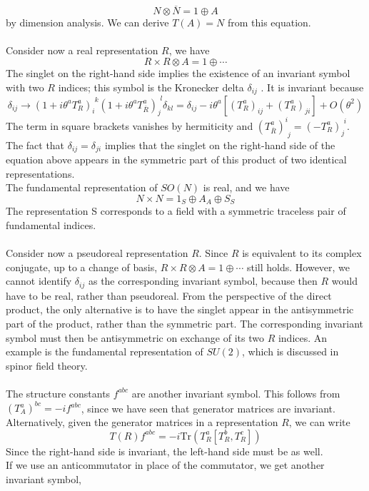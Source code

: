 \documentclass[cyan]{elegantnote}
\begin{document}
\[N \otimes \overline{N} = 1 \oplus A \]
by dimension analysis. We can derive $T(A) = N$ from this equation.
\\ \\
Consider now a real representation $R$, we have
\[R \times R \otimes A = 1 \oplus \cdots\]
The singlet on the right-hand side implies the existence of an invariant symbol with two $R$ indices; this symbol is the Kronecker delta $\delta_{ij}$ . It is invariant because
\[\delta_{ij} \to (1+i\theta^a T^a_R)_{i}^{\phantom{i}k} (1+i\theta^a T^a_{\overline{R}})_{j}^{\phantom{i}l}\delta_{kl} = \delta_{ij} - i\theta^a [(T^a_R)_{ij} + (T^a_R)_{ji}] + O(\theta^2)\]
The term in square brackets vanishes by hermiticity and $(T^{a}_{\overline{R}})^{i}_{\phantom{i}j} = (-T^{a}_R)_{j}^{\phantom{i}i}$. 
The fact that $\delta_{ij} = \delta_{ji}$ implies that the singlet on the right-hand side of the equation above appears in the symmetric part of this product of two identical representations.
\\
The fundamental representation of $SO(N)$ is real, and we have
\[N \times N = 1_S \oplus A_A \oplus S_S\]
The representation S corresponds to a field with a symmetric traceless pair of fundamental indices.
\\ \\
Consider now a pseudoreal representation $R$. Since $R$ is equivalent to its complex conjugate, up to a change of basis, $R \times R \otimes A = 1 \oplus \cdots$  still holds. However, we cannot identify $\delta_{ij}$ as the corresponding invariant symbol, because then $R$ would have to be real, rather than pseudoreal. 
From the perspective of the direct product, the only alternative is to have the singlet appear in the antisymmetric part of the product, rather than the symmetric part. The corresponding invariant symbol must then be antisymmetric on exchange of its two $R$ indices.
An example is the fundamental representation of $SU(2)$, which is discussed in spinor field theory.
\\ \\
The structure constants $f^{abc}$ are another invariant symbol. This follows from $(T^a_A)^{bc} = -if^{abc}$, since we have seen that generator matrices are invariant.
\\
Alternatively, given the generator matrices in a representation $R$, we can write
\[T(R)f^{abc} = -i \mathrm{Tr}(T^a_R[T^b_R,T^c_R])\]
Since the right-hand side is invariant, the left-hand side must be as well.
\\
If we use an anticommutator in place of the commutator, we get another invariant symbol,
\end{document}
